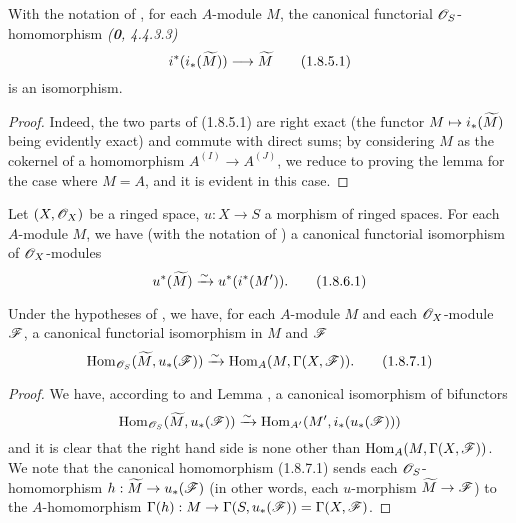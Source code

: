 \begin{lem}[1.8.5]
\label{1.1.8.5}
With the notation of , for each $A$-module $M$, the canonical functorial
$\mathscr{O}_S$-homomorphism \emph{(\textbf{0}, 4.4.3.3)}
\[
  i^*(i_*(\widetilde{M}))\longrightarrow\widetilde{M}
  \tag{1.8.5.1}
\]
is an isomorphism.
\end{lem}

\begin{proof}
\label{proof-1.1.8.5}
Indeed, the two parts of (1.8.5.1) are right exact (the functor
$M\mapsto i_*(\widetilde{M})$ being evidently exact) and commute with direct sums; by
considering $M$ as the cokernel of a homomorphism $A^{(I)}\to A^{(J)}$, we reduce to proving
the lemma for the case where $M=A$, and it is evident in this case.
\end{proof}

\begin{cor}[1.8.6]
\label{1.1.8.6}
Let $(X,\mathscr{O}_X)$ be a ringed space, $u:X\to S$ a morphism of ringed spaces.
For each $A$-module $M$, we have (with the notation of ) a canonical
functorial isomorphism of $\mathscr{O}_X$-modules
\[
  u^*(\widetilde{M})\xrightarrow{\sim} u^*(i^*(M')).
  \tag{1.8.6.1}
\]
\end{cor}

\begin{cor}[1.8.7]
\label{1.1.8.7}
Under the hypotheses of , we have, for each $A$-module $M$ and each
$\mathscr{O}_X$-module $\mathscr{F}$, a canonical functorial isomorphism in $M$ and $\mathscr{F}$
\[
  {\mathop{\mathrm{Hom}}\nolimits}_{\mathscr{O}_S}(\widetilde{M},u_*(\mathscr{F}))\xrightarrow{\sim}{\mathop{\mathrm{Hom}}\nolimits}_A(M,\Gamma(X,\mathscr{F})).
  \tag{1.8.7.1}
\]
\end{cor}

\begin{proof}
\label{proof-1.1.8.7}
We have, according to  and Lemma , a canonical
isomorphism of bifunctors
\[
  {\mathop{\mathrm{Hom}}\nolimits}_{\mathscr{O}_S}(\widetilde{M},u_*(\mathscr{F}))\xrightarrow{\sim}{\mathop{\mathrm{Hom}}\nolimits}_{A'}(M',i_*(u_*(\mathscr{F})))
\]
and it is clear that the right hand side is none other than ${\mathop{\mathrm{Hom}}\nolimits}_A(M,\Gamma(X,\mathscr{F}))$. We
note that the canonical homomorphism (1.8.7.1) sends each $\mathscr{O}_S$-homomorphism
$h:\widetilde{M}\to u_*(\mathscr{F})$ (in other words, each $u$-morphism $\widetilde{M}\to\mathscr{F}$)
to the $A$-homomorphism $\Gamma(h):M\to\Gamma(S,u_*(\mathscr{F}))=\Gamma(X,\mathscr{F})$.
\end{proof}

